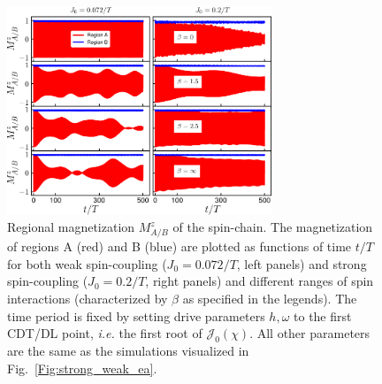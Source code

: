 \documentclass[
nofootinbib,
reprint,
superscriptaddress,
amsmath,amssymb,showkeys,
aps,
prb,
]{revtex4-2}
\begin{document}
	\begin{figure}
		\centering
		\includegraphics[width = 7.9cm]{clean_J_strong_MzAB_betas.pdf}
		\caption{Regional magnetization $M^z_{A/B}$ of the spin-chain. The magnetization of regions A (red) and B (blue) are plotted  as functions of time $t/T$ for both weak spin-coupling ($J_0=0.072/T$, left panels) and strong spin-coupling ($J_0=0.2/T$, right panels) and different ranges of spin interactions (characterized by $\beta$ as specified in the legends). The time period is fixed by setting drive parameters $h,\omega$ to the first CDT/DL point, \textit{i.e.} the first root of $\mathcal{J}_0(\chi)$. All other parameters are the same as the simulations visualized in Fig.~\ref{Fig:strong_weak_ea}.}
		\label{Fig:regiogionalmag}
	\end{figure} 
\end{document}
